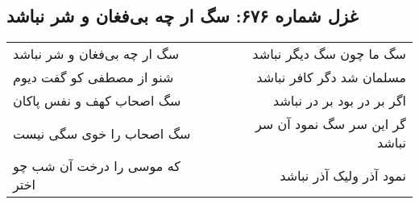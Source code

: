\begin{center}
\section*{غزل شماره ۶۷۶: سگ ار چه بی‌فغان و شر نباشد}
\label{sec:0676}
\begin{longtable}{l p{0.5cm} r}
سگ ار چه بی‌فغان و شر نباشد
&&
سگ ما چون سگ دیگر نباشد
\\
شنو از مصطفی کو گفت دیوم
&&
مسلمان شد دگر کافر نباشد
\\
سگ اصحاب کهف و نفس پاکان
&&
اگر بر در بود بر در نباشد
\\
سگ اصحاب را خوی سگی نیست
&&
گر این سر سگ نمود آن سر نباشد
\\
که موسی را درخت آن شب چو اختر
&&
نمود آذر ولیک آذر نباشد
\\
\end{longtable}
\end{center}
